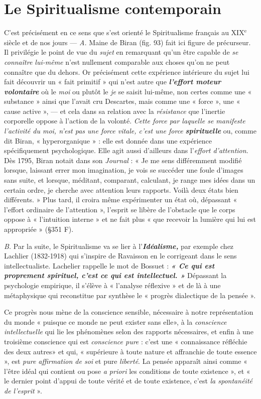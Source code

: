 \section{Le Spiritualisme contemporain}%
C’est précisément
en ce sens que s’est orienté le Spiritualisme français au {\footnotesize XIX}$^\text{e}$ siècle
et de nos jours — {\it A.} Maine de Biran (fig. 93) fait ici figure de précurseur.
Il privilégie le point de vue du {\it sujet} en remarquant qu’un être
capable de {\it se connaître lui-même} n’est nullement comparable aux
choses qu’on ne peut connaître que du dehors. Or précisément cette
expérience intérieure du sujet lui fait découvrir un « fait primitif »
qui n’est autre que \textbf{\textit {l'effort moteur volontaire}} où le {\it moi} ou plutôt
le {\it je} se saisit lui-même, non certes comme une « substance » ainsi que
l’avait cru Descartes, mais comme une « force », une « cause active »,
— et cela dans sa relation avec la {\it résistance} que l’inertie corporelle
oppose à l’action de la volonté. {\it Cette force par laquelle se manifeste
l'activité du moi, n’est pas une force vitale, c'est une force} \textbf{\textit {spirituelle}} ou,
comme dit Biran, « hyperorganique » : elle est donnée dans une
expérience spécifiquement psychologique. Elle agit aussi d’ailleurs dans
l'{\it effort d'attention}. Dès 1795, Biran notait dans son {\it Journal} : « Je
me sens différemment modifié lorsque, laissant errer mon imagination,
je vois se succéder une foule d’images sans suite, et lorsque, méditant,
comparant, calculant, je range mes idées dans un certain ordre, je
cherche avec attention leurs rapports. Voilà deux états bien différents. »
Plus tard, il croira même expérimenter un état où, dépassant
« l'effort ordinaire de l'attention », l'esprit se libère de l'obstacle
que le corps oppose à « l'intuition interne » et ne fait plus « que recevoir
la lumière qui lui est appropriée » (\S 351 F).

{\it B.} Par la suite, le Spiritualisme va se lier à l’\textbf{\textit {Idéalisme,}} par
exemple chez Lachlier (1832-1918) qui s'inspire de Ravaisson
en le corrigeant dans le sens intellectualiste. Lachelier rappelle
le mot de Bossuet : \textbf{\textit {« Ce qui est proprement spirituel, c'est
ce qui est intellectuel. »}} Dépassant la psychologie empirique, il s’élève
à « l'analyse réflexive » et de là à une métaphysique qui reconstitue
par synthèse le « progrès dialectique de la pensée ».

\vspace{0.24cm}
{\footnotesize Ce progrès nous mène de la conscience sensible, nécessaire à notre
représentation du monde « puisque ce monde ne peut exister sans elle»,
à la {\it conscience intellectuelle} qui lie les phénomènes selon des rapports
nécessaires, et enfin à une troisième conscience qui est {\it conscience pure} :
c'est une « connaissance réfléchie des deux autres»  et qui, « supérieure à
toute nature et affranchie de toute essence », est {\it pure affirmation de soi}
et pure {\it liberté}. La pensée apparaît ainsi comme « l'être idéal qui contient
ou pose {\it a priori} les conditions de toute existence », et « le dernier point
d'appui de toute vérité et de toute existence, c'est {\it la spontanéité de l'esprit} ».}
\vspace{0.31cm}

